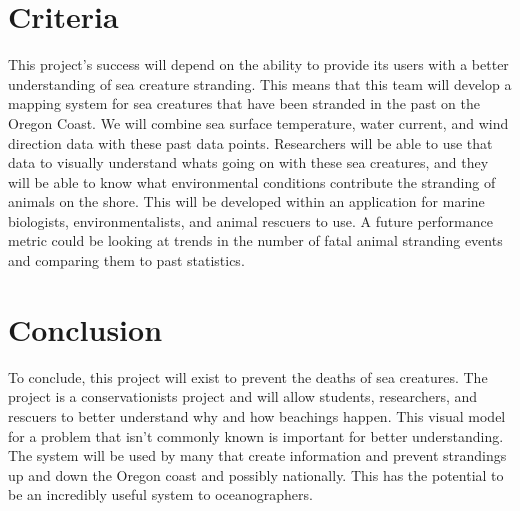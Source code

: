 \documentclass[onecolumn, draftclsnofoot,10pt, compsoc]{IEEEtran}
\begin{document}
      \section{Criteria}
        This project's success will depend on the ability to provide its users with a better understanding of sea creature stranding. This means that this team will develop a mapping system for sea creatures that have been stranded in the past on the Oregon Coast. We will combine sea surface temperature, water current, and wind direction data with these past data points.  Researchers will be able to use that data to visually understand whats going on with these sea creatures, and they will be able to know what environmental conditions contribute the stranding of animals on the shore. This will be developed within an application for marine biologists, environmentalists, and animal rescuers to use. A future performance metric could be looking at trends in the number of fatal animal stranding events and comparing them to past statistics.
       


      \section{Conclusion}
          To conclude, this project will exist to prevent the deaths of sea creatures. The project is a conservationists project and will allow students, researchers, and rescuers to better understand why and how beachings happen. This visual model for a problem that isn't commonly known is important for better understanding. The system will be used by many that create information and prevent strandings up and down the Oregon coast and possibly nationally. This has the potential to be an incredibly useful system to oceanographers.

        
        
\end{document}
